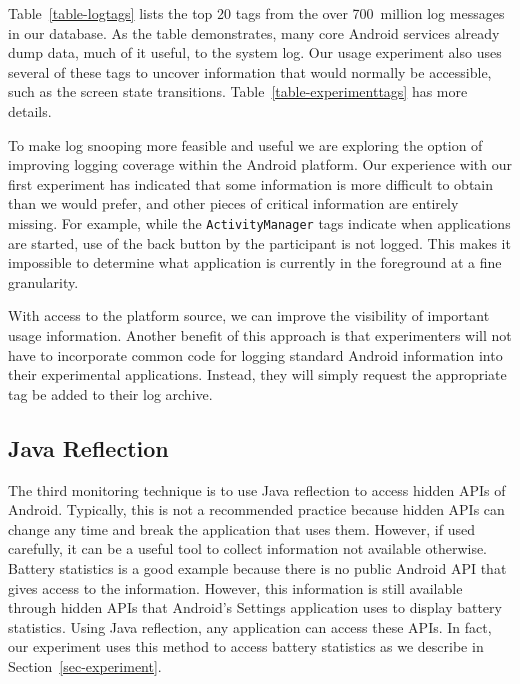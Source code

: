 Table~\ref{table-logtags} lists the top 20 tags from the over 700~million log
messages in our database. As the table demonstrates, many core Android
services already dump data, much of it useful, to the system log. Our usage
experiment also uses several of these tags to uncover information that would
normally be accessible, such as the screen state transitions.
Table~\ref{table-experimenttags} has more details.

To make log snooping more feasible and useful we are exploring the option of
improving logging coverage within the Android platform. Our experience with
our first experiment has indicated that some information is more difficult to
obtain than we would prefer, and other pieces of critical information are
entirely missing. For example, while the \texttt{ActivityManager} tags
indicate when applications are started, use of the back button by the
participant is not logged. This makes it impossible to determine what
application is currently in the foreground at a fine granularity.

With access to the platform source, we can improve the visibility of
important usage information. Another benefit of this approach is that
experimenters will not have to incorporate common code for logging standard
Android information into their experimental applications. Instead, they will
simply request the appropriate tag be added to their log archive.

\subsection{Java Reflection}

The third monitoring technique is to use Java reflection to access hidden APIs
of Android. Typically, this is not a recommended practice because hidden APIs
can change any time and break the application that uses them. However, if used
carefully, it can be a useful tool to collect information not available
otherwise. Battery statistics is a good example because there is no public
Android API that gives access to the information. However, this information is
still available through hidden APIs that Android's Settings application uses to
display battery statistics. Using Java reflection, any application can access
these APIs. In fact, our experiment uses this method to access battery
statistics as we describe in Section~\ref{sec-experiment}.
